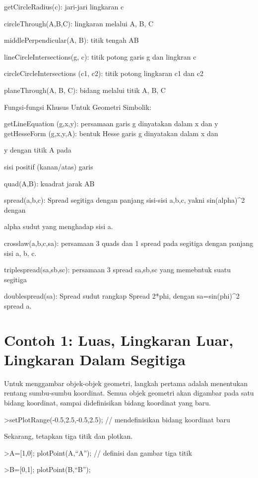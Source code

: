 \documentclass[
]{book}
\begin{document}
getCircleRadius(c): jari-jari lingkaran c

circleThrough(A,B,C): lingkaran melalui A, B, C

middlePerpendicular(A, B): titik tengah AB

lineCircleIntersections(g, c): titik potong garis g dan lingkran c

circleCircleIntersections (c1, c2): titik potong lingkaran c1 dan c2

planeThrough(A, B, C): bidang melalui titik A, B, C

Fungsi-fungsi Khusus Untuk Geometri Simbolik:

getLineEquation (g,x,y): persamaan garis g dinyatakan dalam x dan y\\
getHesseForm (g,x,y,A): bentuk Hesse garis g dinyatakan dalam x dan

y dengan titik A pada

sisi positif (kanan/atas) garis

quad(A,B): kuadrat jarak AB

spread(a,b,c): Spread segitiga dengan panjang sisi-sisi a,b,c, yakni sin(alpha)\^{}2 dengan

alpha sudut yang menghadap sisi a.

crosslaw(a,b,c,sa): persamaan 3 quads dan 1 spread pada segitiga dengan panjang sisi a, b, c.

triplespread(sa,sb,sc): persamaan 3 spread sa,sb,sc yang memebntuk suatu segitiga

doublespread(sa): Spread sudut rangkap Spread 2*phi, dengan sa=sin(phi)\^{}2 spread a.

\section{Contoh 1: Luas, Lingkaran Luar, Lingkaran Dalam Segitiga}\label{contoh-1-luas-lingkaran-luar-lingkaran-dalam-segitiga}

Untuk menggambar objek-objek geometri, langkah pertama adalah menentukan rentang sumbu-sumbu koordinat. Semua objek geometri akan digambar pada satu bidang koordinat, sampai didefinisikan bidang koordinat yang baru.

\textgreater setPlotRange(-0.5,2.5,-0.5,2.5); // mendefinisikan bidang koordinat baru

Sekarang, tetapkan tiga titik dan plotkan.

\textgreater A={[}1,0{]}; plotPoint(A,``A''); // definisi dan gambar tiga titik

\textgreater B={[}0,1{]}; plotPoint(B,``B'');
\end{document}
